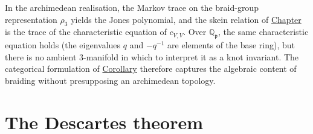 \begin{remark}
  \label{rem:skein-archimedean-shadow}
In the archimedean realisation, the Markov trace on the braid-group
representation $\rho_3$ yields the Jones polynomial, and the skein
relation of \hyperref[chap:experimental]{Chapter} is the trace of the
characteristic equation of $c_{V,V}$.  Over $\mathbb{Q}_\mathfrak{p}$, the
same characteristic equation holds (the eigenvalues $q$ and $-q^{-1}$
are elements of the base ring), but there is no ambient $3$-manifold in
which to interpret it as a knot invariant.  The categorical formulation
of \hyperref[cor:descartes-braid-structure]{Corollary} therefore captures
the algebraic content of braiding without presupposing an archimedean
topology.
\end{remark}

\section{The Descartes theorem}
\label{sec:descartes-theorem}

